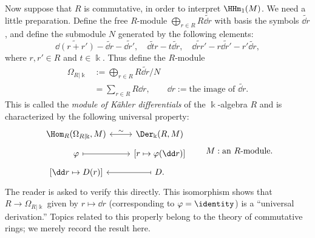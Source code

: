 \begin{example}
	Now suppose that $R$ is commutative, in order to interpret $\HHm_1(M)$.
	We need a little preparation. Define the free $R$-module
	$\bigoplus_{r\in R}R\widetilde{\dd r}$ with basis the symbols
	$\widetilde{\dd r}$, and define the submodule $N$ generated by the
	following elements:
	\[ \widetilde{\dd(r+r')}-\widetilde{\dd r}-\widetilde{\dd r'},
		\quad \widetilde{\dd tr}-t\widetilde{\dd r},
		\quad \widetilde{\dd rr'}-r\widetilde{\dd r'}-r'\widetilde{\dd r}, \]
	where $r,r'\in R$ and $t\in\Bbbk$. Thus define the $R$-module
	\begin{align*}
		\Omega_{R|\Bbbk}
		&:=\bigoplus_{r\in R}R\widetilde{\dd r}\bigg/N\\
		&=\sum_{r\in R}R\dd r,\qquad
		\dd r:=\text{the image of }\widetilde{\dd r}.
	\end{align*}
	This is called the \emph{module of Kähler differentials} of the
	$\Bbbk$-algebra $R$ and is characterized by the following universal
	property:
	\[\begin{tikzcd}[row sep=tiny]
		\Hom_R(\Omega_{R|\Bbbk}, M) \arrow[leftrightarrow, r, "\sim"]
		& \Der_{\Bbbk}(R, M) \\
		\varphi \arrow[mapsto, r] & {\left[r\mapsto\varphi(\dd r)\right]} \\
		{\left[\dd r\mapsto D(r)\right]} & D \arrow[mapsto, l].
	\end{tikzcd}
	\qquad M:\text{an $R$-module}. \]
	The reader is asked to verify this directly. This isomorphism shows that
	$R\to\Omega_{R|\Bbbk}$ given by $r\mapsto\dd r$ (corresponding to
	$\varphi=\identity$) is a ``universal derivation.'' Topics related to
	this properly belong to the theory of commutative rings; we merely record
	the result here.


\end{example}
